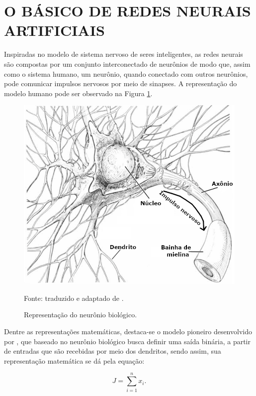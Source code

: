 \newpage
\clearpage

\section{O BÁSICO DE REDES NEURAIS ARTIFICIAIS}
\label{deep}
Inspiradas no modelo de sistema nervoso de seres inteligentes, as redes neurais são compostas por um conjunto interconectado de neurônios de modo que, assim como o sistema humano, um neurônio, quando conectado com outros neurônios, pode comunicar impulsos nervosos por meio de sinapses. A representação do modelo humano pode ser observado na Figura \ref{deep:fig:1}.

\begin{figure}[H]
    \centering
    \caption{Representação do neurônio biológico.}
    \includegraphics[width=1\linewidth]{recursos/imagens/deep/neuronio.png}
    \label{deep:fig:1}

    Fonte: traduzido e adaptado de \cite{Stevens1979}.
\end{figure}

Dentre as representações matemáticas, destaca-se o modelo pioneiro desenvolvido por \cite{mcculloch1943logical}, que baseado no neurônio biológico busca definir uma saída binária, a partir de entradas que são recebidas por meio dos dendritos, sendo assim, sua representação matemática se dá pela equação:

\begin{equation}
    \label{deep:eq:1}
    J = \sum_{i = 1}^{n} x_i.
\end{equation}

